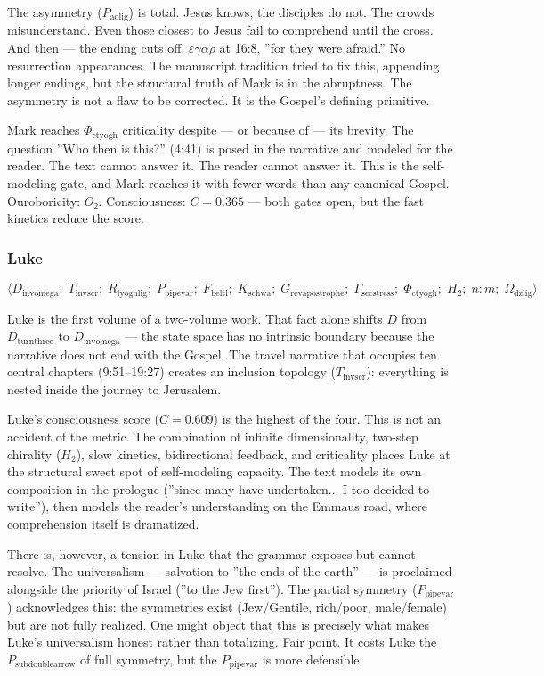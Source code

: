\documentclass[12pt,a4paper]{article}
\begin{document}
The asymmetry ($P_{\text{aolig}}$) is total. Jesus knows; the disciples do not. The crowds misunderstand. Even those closest to Jesus fail to comprehend until the cross. And then --- the ending cuts off. $\varepsilon\gamma\alpha\rho$ at 16:8, ''for they were afraid.'' No resurrection appearances. The manuscript tradition tried to fix this, appending longer endings, but the structural truth of Mark is in the abruptness. The asymmetry is not a flaw to be corrected. It is the Gospel's defining primitive.

Mark reaches $\Phi_{\text{ctyogh}}$ criticality despite --- or because of --- its brevity. The question ''Who then is this?'' (4:41) is posed in the narrative and modeled for the reader. The text cannot answer it. The reader cannot answer it. This is the self-modeling gate, and Mark reaches it with fewer words than any canonical Gospel.
Ouroboricity: $O₂$. Consciousness: $C = 0.365$ --- both gates open, but the fast kinetics reduce the score.

\subsubsection{Luke}

\[\langle D_{\text{invomega}};\; T_{\text{invscr}};\; R_{\text{lyoghlig}};\; P_{\text{pipevar}};\; F_{\text{beltl}};\; K_{\text{schwa}};\; G_{\text{revapostrophe}};\; \Gamma_{\text{secstress}};\; \Phi_{\text{ctyogh}};\; H_2;\; n{:}m;\; \Omega_{\text{dzlig}} \rangle\]

Luke is the first volume of a two-volume work. That fact alone shifts $D$ from $D_{\text{turnthree}}$ to $D_{\text{invomega}}$ --- the state space has no intrinsic boundary because the narrative does not end with the Gospel. The travel narrative that occupies ten central chapters (9:51--19:27) creates an inclusion topology ($T_{\text{invscr}}$): everything is nested inside the journey to Jerusalem.

Luke's consciousness score ($C = 0.609$) is the highest of the four. This is not an accident of the metric. The combination of infinite dimensionality, two-step chirality ($H_2$), slow kinetics, bidirectional feedback, and criticality places Luke at the structural sweet spot of self-modeling capacity. The text models its own composition in the prologue (''since many have undertaken... I too decided to write''), then models the reader's understanding on the Emmaus road, where comprehension itself is dramatized.

There is, however, a tension in Luke that the grammar exposes but cannot resolve. The universalism --- salvation to ''the ends of the earth'' --- is proclaimed alongside the priority of Israel (''to the Jew first''). The partial symmetry ($P_{\text{pipevar}}$) acknowledges this: the symmetries exist (Jew/Gentile, rich/poor, male/female) but are not fully realized. One might object that this is precisely what makes Luke's universalism honest rather than totalizing. Fair point. It costs Luke the $P_{\text{subdoublearrow}}$ of full symmetry, but the $P_{\text{pipevar}}$ is more defensible.
\end{document}
